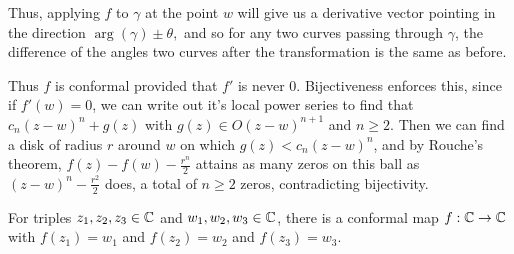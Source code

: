 \documentclass{homework}
\begin{document}
\begin{solution}
                                                                                                                                                                                          Thus, applying $f$ to $\gamma$ at the point $w$ will give us a derivative vector pointing in the direction $\arg(\gamma) \pm \theta,$ and so for any two curves passing through $\gamma$, the difference of the angles two curves after the transformation is the same as before.

                                                                                                                                                                                          Thus $f$ is conformal provided that $f'$ is never 0. Bijectiveness enforces this, since if $f'(w)= 0$, we can write out it's local power series to find that $c_n(z-w)^n + g(z)$ with $g(z)\in O(z-w)^{n+1}$ and $n\geq 2$. Then we can find a disk of radius $r$ around $w$ on which $g(z) < c_n(z-w)^n$, and by Rouche's theorem,
                                                                                                                                                                                          $f(z)-f(w)-\frac{r^n}{2}$ attains as many zeros on this ball as $(z-w)^n-\frac{r^2}{2}$ does, a total of $n\geq 2$ zeros, contradicting bijectivity.
                                                                                                                                                                                          \end{solution}
                                                                                                                                                                                          \begin{problem}
                                                                                                                                                                                            For triples $z_1, z_2, z_3 \in \mathbb{C}$ and $w_1,w_2,w_3 \in \mathbb{C}$, there
                                                                                                                                                                                              is a conformal map $f : \mathbb{C} \to \mathbb{C}$ with $f(z_1) = w_1$ and
                                                                                                                                                                                                $f(z_2) = w_2$ and $f(z_3) = w_3$. %
                                                                                                                                                                                                \end{problem}
\end{document}
